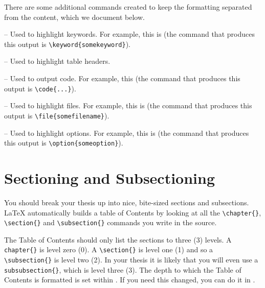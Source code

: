 There are some additional commands created to keep the formatting separated from the content, which we document below.

 -- Used to highlight keywords. For example, this is  (the command that produces this output is \verb|\keyword{somekeyword}|).

 -- Used to highlight table headers. 

 -- Used to output code. For example, this  (the command that produces this output is \verb|\code{...}|).

 -- Used to highlight files. For example, this is  (the command that produces this output is \verb|\file{somefilename}|).

 -- Used to highlight options. For example, this is  (the command that produces this output is \verb|\option{someoption}|).


\section{Sectioning and Subsectioning}

You should break your thesis up into nice, bite-sized sections and subsections. \LaTeX{} automatically builds a table of Contents by looking at all the \verb|\chapter{}|, \verb|\section{}|  and \verb|\subsection{}| commands you write in the source.

The Table of Contents should only list the sections to three (3) levels. A \verb|chapter{}| is level zero (0). A \verb|\section{}| is level one (1) and so a \verb|\subsection{}| is level two (2). In your thesis it is likely that you will even use a \verb|subsubsection{}|, which is level three (3). The depth to which the Table of Contents is formatted is set within . If you need this changed, you can do it in .

